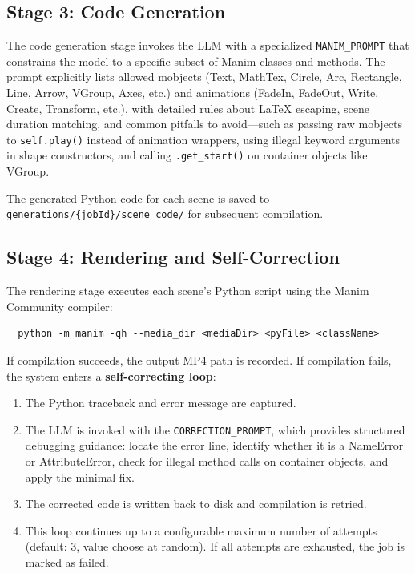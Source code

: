 \documentclass[12pt,a4paper,twoside,openright]{report}
\begin{document}
\subsection{Stage 3: Code Generation}

The code generation stage invokes the LLM with a specialized \texttt{MANIM\_PROMPT} that constrains the model to a specific subset of Manim classes and methods. The prompt explicitly lists allowed mobjects (Text, MathTex, Circle, Arc, Rectangle, Line, Arrow, VGroup, Axes, etc.) and animations (FadeIn, FadeOut, Write, Create, Transform, etc.), with detailed rules about LaTeX escaping, scene duration matching, and common pitfalls to avoid---such as passing raw mobjects to \texttt{self.play()} instead of animation wrappers, using illegal keyword arguments in shape constructors, and calling \texttt{.get\_start()} on container objects like VGroup.

The generated Python code for each scene is saved to \texttt{generations/\{jobId\}/scene\_code/} for subsequent compilation.

\subsection{Stage 4: Rendering and Self-Correction}

The rendering stage executes each scene's Python script using the Manim Community compiler:

\begin{verbatim}
  python -m manim -qh --media_dir <mediaDir> <pyFile> <className>
\end{verbatim}

If compilation succeeds, the output MP4 path is recorded. If compilation fails, the system enters a \textbf{self-correcting loop}:

\begin{enumerate}
  \item The Python traceback and error message are captured.
  \item The LLM is invoked with the \texttt{CORRECTION\_PROMPT}, which provides structured debugging guidance: locate the error line, identify whether it is a NameError or AttributeError, check for illegal method calls on container objects, and apply the minimal fix.
  \item The corrected code is written back to disk and compilation is retried.
  \item This loop continues up to a configurable maximum number of attempts (default: 3, value choose at random). If all attempts are exhausted, the job is marked as failed.
\end{enumerate}
\end{document}
